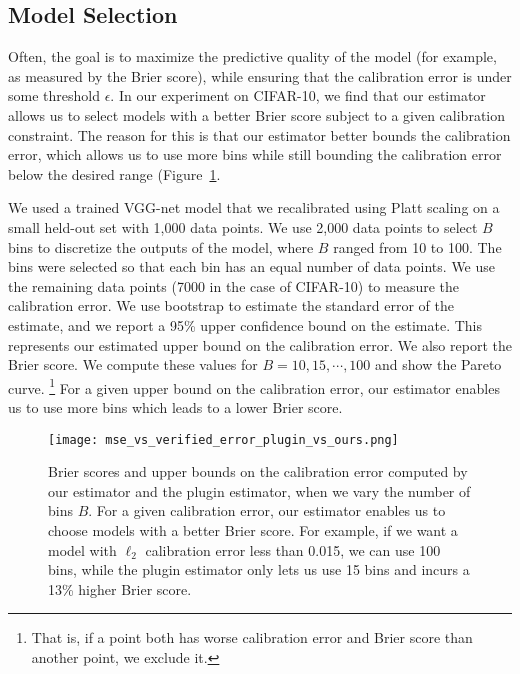 \subsection{Model Selection}

Often, the goal is to maximize the predictive quality of the model (for example, as measured by the Brier score), while ensuring that the calibration error is under some threshold $\epsilon$. In our experiment on CIFAR-10, we find that our estimator allows us to select models with a better Brier score subject to a given calibration constraint. The reason for this is that our estimator better bounds the calibration error, which allows us to use more bins while still bounding the calibration error below the desired range (Figure~\ref{fig:mse_vs_ce}. 


We used a trained VGG-net model that we recalibrated using Platt scaling on a small held-out set with 1,000 data points. We use 2,000 data points to select $B$ bins to discretize the outputs of the model, where $B$ ranged from 10 to 100. The bins were selected so that each bin has an equal number of data points. We use the remaining data points (7000 in the case of CIFAR-10) to measure the calibration error. We use bootstrap to estimate the standard error of the estimate, and we report a 95\% upper confidence bound on the estimate. This represents our estimated upper bound on the calibration error. We also report the Brier score. We compute these values for $B = 10, 15, \cdots, 100$ and show the Pareto curve. \footnote{That is, if a point both has worse calibration error and Brier score than another point, we exclude it.} For a given upper bound on the calibration error, our estimator enables us to use more bins which leads to a lower Brier score.
\begin{figure}
  \centering
  \texttt{[image: mse\_vs\_verified\_error\_plugin\_vs\_ours.png]}
  \caption{Brier scores and upper bounds on the calibration error computed by our estimator and the plugin estimator, when we vary the number of bins $B$. For a given calibration error, our estimator enables us to choose models with a better Brier score. For example, if we want a model with $\ell_2$ calibration error less than 0.015, we can use 100 bins, while the plugin estimator only lets us use 15 bins and incurs a 13\% higher Brier score.}
  \label{fig:mse_vs_ce}
\end{figure}